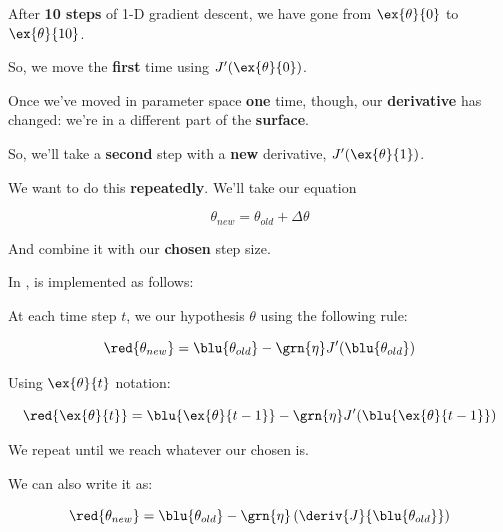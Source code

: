         \miniex After \textbf{10 steps} of 1-D gradient descent, we have gone from $\ex{\theta}{0}$ to $\ex{\theta}{10}$.
        
        So, we move the \textbf{first} time using $J'(\ex{\theta}{0})$.
        
        Once we've moved in parameter space \textbf{one} time, though, our \textbf{derivative} has changed: we're in a different part of the \textbf{surface}.
        
        So, we'll take a \textbf{second} step with a \textbf{new} derivative, $J'(\ex{\theta}{1})$.
        
        We want to do this \textbf{repeatedly}. We'll take our equation
        
        \begin{equation}
            \theta_{new} = \theta_{old} + \Delta \theta
        \end{equation}
        
        And combine it with our \textbf{chosen} step size.\\
        
        \begin{kequation}
            In ,  is implemented as follows:
        
            At each time step $t$, we  our hypothesis $\theta$ using the following rule:
            
            \begin{equation*}
                \red{ \theta_{new} } = 
                \blu{ \theta_{old} } - \grn{\eta} J'( \blu{ \theta_{old} })
            \end{equation*}
            
            Using $\ex{\theta}{t}$ notation:
            
            \begin{equation*}
                \red{ \ex{\theta}{t} } = 
                \blu{ \ex{\theta}{t-1} } -
                \grn{\eta} J'( \blu{ \ex{\theta}{t-1} })
            \end{equation*}
            
            We repeat until we reach whatever our chosen  is.
        \end{kequation}
        
        We can also write it as:
        
        \begin{equation*}
                \red{ \theta_{new} } = 
                \blu{ \theta_{old} } - 
                \grn{\eta} 
                \left( \deriv{J}{ \blu{ \theta_{old} }} \right)
            \end{equation*}
        
